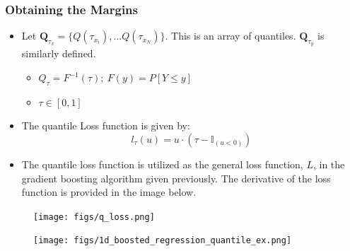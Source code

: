 \documentclass[t, pdftex]{beamer}
\begin{document}
\begin{frame}[shrink=30]
\frametitle{Obtaining the Margins}
\begin{itemize}
\item Let $\mathbf Q_{\tau_x} = \{Q(\tau_{x_i}),... Q(\tau_{x_N}) \} $. This is an array of quantiles. $\mathbf Q_{\tau_y}$ is similarly defined.
\begin{itemize}
	\item $Q_\tau = F^{-1}(\tau);\ F(y)=P[Y \leq y]$
	\item $\tau \in [0, 1]$
\end{itemize}
\item The quantile Loss function is given by:
\[
l_\tau(u) = u \cdot (\tau - \mathbb{I}_{(u < 0)})
\]
\item The quantile loss function is utilized as the general loss function, $L$, in the gradient boosting algorithm given previously.  The derivative of the loss function is provided in the image below.
\end{itemize}
\begin{figure}
        \centering
        \begin{minipage}{.5\textwidth}
            \centering
            \texttt{[image: figs/q\_loss.png]}
        \end{minipage}%
        \begin{minipage}{.5\textwidth}
            \centering
            \texttt{[image: figs/1d\_boosted\_regression\_quantile\_ex.png]}
        \end{minipage}
\end{figure}
\end{frame}
\end{document}
